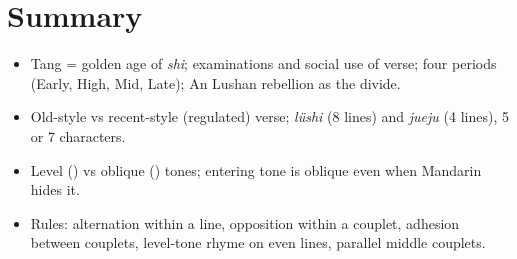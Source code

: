 \section*{Summary}
\begin{itemize}
  \item Tang = golden age of \emph{shi}; examinations and social use of verse; four
        periods (Early, High, Mid, Late); An Lushan rebellion as the divide.
  \item Old-style vs recent-style (regulated) verse; \emph{lüshi} (8 lines) and \emph{jueju}
        (4 lines), 5 or 7 characters.
  \item Level () vs oblique () tones; entering tone is oblique even when
        Mandarin hides it.
  \item Rules: alternation within a line, opposition within a couplet, adhesion between
        couplets, level-tone rhyme on even lines, parallel middle couplets.
\end{itemize}
